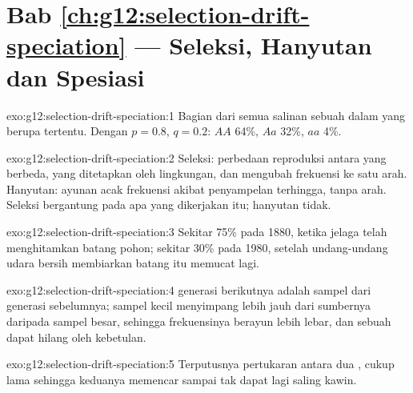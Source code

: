\section*{Bab \ref{ch:g12:selection-drift-speciation} --- Seleksi, Hanyutan dan Spesiasi}

\begin{solution}{exo:g12:selection-drift-speciation:1}
Bagian dari semua salinan sebuah  dalam  yang berupa 
tertentu. Dengan $p = 0.8$, $q = 0.2$: $AA$ 64\%, $Aa$ 32\%, $aa$ 4\%.
\end{solution}

\begin{solution}{exo:g12:selection-drift-speciation:2}
Seleksi: perbedaan reproduksi antara   yang berbeda, yang
ditetapkan oleh lingkungan, dan mengubah frekuensi ke satu arah.
Hanyutan: ayunan acak frekuensi akibat penyampelan  terhingga,
tanpa arah. Seleksi bergantung pada apa yang dikerjakan  itu;
hanyutan tidak.
\end{solution}

\begin{solution}{exo:g12:selection-drift-speciation:3}
Sekitar 75\% pada 1880, ketika jelaga telah menghitamkan batang pohon;
sekitar 30\% pada 1980, setelah undang-undang udara bersih membiarkan
batang itu memucat lagi.
\end{solution}

\begin{solution}{exo:g12:selection-drift-speciation:4}
 generasi berikutnya adalah sampel dari generasi sebelumnya;
sampel kecil menyimpang lebih jauh dari sumbernya daripada sampel
besar, sehingga frekuensinya berayun lebih lebar, dan sebuah 
dapat hilang oleh kebetulan.
\end{solution}

\begin{solution}{exo:g12:selection-drift-speciation:5}
Terputusnya pertukaran  antara dua , cukup lama sehingga
keduanya memencar sampai tak dapat lagi saling kawin.
\end{solution}

